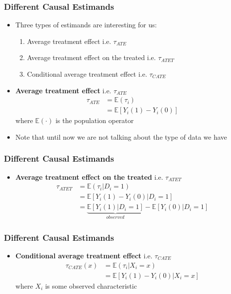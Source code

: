 \documentclass{beamer}
\begin{document}
\begin{frame}
	\frametitle{Different Causal Estimands}
	\begin{itemize}
		\item Three types of estimands are interesting for us:
			\begin{enumerate}
				\item Average treatment effect i.e. $\tau_{ATE}$
				\item Average treatment effect on the treated i.e. $\tau_{ATET}$
				\item Conditional average treatment effect i.e. $\tau_{CATE}$
			\end{enumerate}
		\item \textbf{Average treatment effect  } i.e. $\tau_{ATE}$
			\begin{align*}
				\tau_{ATE} &= \mathbb E(\tau_i)\\
				&= \mathbb E[ Y_{i}(1) - Y_i(0) ]
			\end{align*}
		where $\mathbb E(\boldsymbol{\cdot})$ is the population operator 
		\item Note that until now we are not talking about the type of data we have
	\end{itemize}
\end{frame}


\begin{frame}
	\frametitle{Different Causal Estimands}
	\begin{itemize}
		\item \textbf{Average treatment effect on the treated} i.e. $\tau_{ATET}$
			\begin{align*}
				\tau_{ATET} &= \mathbb E(\tau_i | D_i = 1) \\
				&= \mathbb E[Y_i(1) - Y_i(0) | D_i=1]\\
				&= \underbrace{\mathbb E[Y_i(1)  | D_i=1]}_{observed} - \mathbb E[ Y_i(0) | D_i=1]
			\end{align*}
	\end{itemize}
\end{frame}



\begin{frame}
	\frametitle{Different Causal Estimands}
	\begin{itemize}
		\item \textbf{Conditional average treatment effect} i.e. $\tau_{CATE}$
		\begin{align*}
			\tau_{CATE}(x) &= \mathbb E(\tau_i | X_i = x) \\
			&= \mathbb E[Y_i(1) - Y_i(0) | X_i=x]
		\end{align*}
	where $X_i$ is some observed characteristic
	\end{itemize}
\end{frame}
\end{document}
